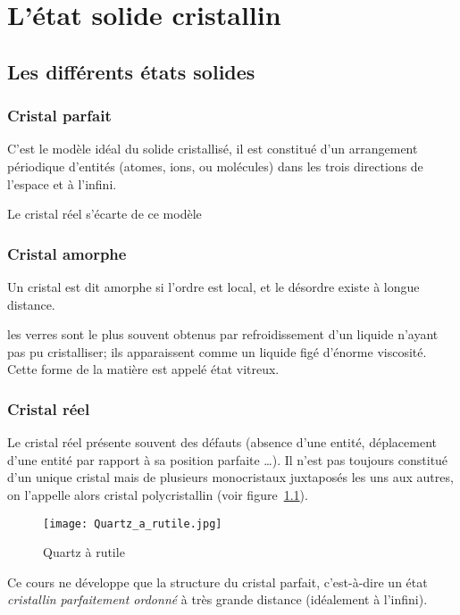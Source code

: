 \chapter{L'état solide cristallin}
\section{Les différents états solides}
\subsection{Cristal parfait}
C'est le modèle idéal du solide cristallisé, il est constitué d'un arrangement
périodique d’entités (atomes, ions, ou molécules) dans les trois directions
de l’espace et à l’infini.
\begin{rem}
    Le cristal réel s'écarte de ce modèle
\end{rem}

\subsection{Cristal amorphe}
Un cristal est dit amorphe si l'ordre est local, et le désordre existe
à longue distance.
\begin{ex}[le verre]
    les verres sont le plus souvent obtenus par refroidissement d’un liquide
    n’ayant pas pu cristalliser; ils apparaissent comme un liquide figé 
    d’énorme viscosité. Cette forme de la matière est appelé état vitreux.
\end{ex}

\subsection{Cristal réel}
Le cristal réel présente souvent des défauts (absence d'une entité, déplacement
d'une entité par rapport à sa position parfaite \dots). Il n'est pas toujours 
constitué d’un unique cristal mais de plusieurs monocristaux juxtaposés
les uns aux autres, on l’appelle alors cristal polycristallin
(voir figure~\ref{fig:quartz_rutile}).
\begin{figure}
    \centering
    \texttt{[image: Quartz\_a\_rutile.jpg]}
    \caption{Quartz à rutile}\label{fig:quartz_rutile}
\end{figure}
\begin{rem}
    Ce cours ne développe que la structure du cristal parfait, c'est-à-dire un
    état \emph{cristallin parfaitement ordonné} à très grande distance
    (idéalement à l'infini).
\end{rem}


